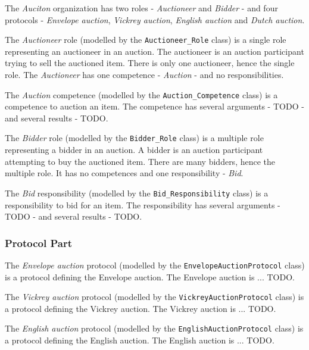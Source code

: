 The \textit{Auciton} organization has two roles - \textit{Auctioneer} and \textit{Bidder} - and four protocols - \textit{Envelope auction}, \textit{Vickrey auction}, \textit{English auction} and \textit{Dutch auction}.

The \textit{Auctioneer} role (modelled by the \texttt{Auctioneer\_Role} class) is a single role representing an auctioneer in an auction.
The auctioneer is an auction participant trying to sell the auctioned item.
There is only one auctioneer, hence the single role.
The \textit{Auctioneer} has one competence - \textit{Auction} - and no responsibilities.

The \textit{Auction} competence (modelled by the \texttt{Auction\_Competence} class) is a competence to auction an item.
The competence has several arguments - TODO - and several results - TODO.

The \textit{Bidder} role (modelled by the \texttt{Bidder\_Role} class) is a multiple role representing a bidder in an auction.
A bidder is an auction participant attempting to buy the auctioned item.
There are many bidders, hence the multiple role.
It has no competences and one responsibility - \textit{Bid}.

The \textit{Bid} responsibility (modelled by the \texttt{Bid\_Responsibility} class) is a responsibility to bid for an item.
The responsibility has several arguments - TODO - and several results - TODO.

\subsubsection*{Protocol Part}

The \textit{Envelope auction} protocol (modelled by the \texttt{EnvelopeAuctionProtocol} class) is a protocol defining the Envelope auction.
The Envelope auction is ... TODO.

The \textit{Vickrey auction} protocol (modelled by the \texttt{VickreyAuctionProtocol} class) is a protocol defining the Vickrey auction.
The Vickrey auction is ... TODO.

The \textit{English auction} protocol (modelled by the \texttt{EnglishAuctionProtocol} class) is a protocol defining the English auction. 
The English auction is ... TODO.

